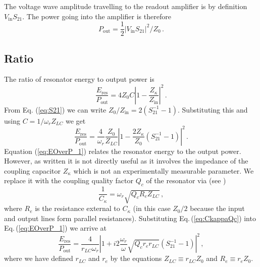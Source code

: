 The voltage wave amplitude travelling to the readout amplifier is by definition $V_{\text{in}}S_{21}$. The power going into the amplifier is therefore \begin{equation}
P_{\text{out}} = \frac{1}{2} \left| V_{\text{in}} S_{21} \right|^2/Z_0 \, . \end{equation}

\subsection{Ratio}

The ratio of resonator energy to output power is \begin{equation}
\frac{E_{\text{res}}}{P_{\text{out}}} = 4 Z_0 C \left| 1 - \frac{Z_{\kappa}}{Z_{\text{in}}} \right|^2 \, . \end{equation}
From Eq. (\ref{eq:S21}) we can write $Z_0/Z_{\text{in}} = 2(S_{21}^{-1} - 1)$. Substituting this and using $C=1/\omega_r Z_{LC}$ we get \begin{equation}
\frac{E_{\text{res}}}{P_{\text{out}}} = \frac{4}{\omega_r}\frac{Z_0}{Z_{LC}} \left| 1 - \frac{2Z_{\kappa}}{Z_0}\left( S_{21}^{-1}-1 \right) \right| ^2 \, . \label{eq:EOverP_1} \end{equation}
Equation (\ref{eq:EOverP_1}) relates the resonator energy to the output power. However, as written it is not directly useful as it involves the impedance of the coupling capacitor $Z_{\kappa}$ which is not an experimentally measurable parameter. We replace it with the coupling quality factor $Q_c$ of the resonator via (see \citeinternaltype {}) \begin{equation}
\frac{1}{C_{\kappa}} = \omega_r \sqrt{Q_c R_e Z_{LC}} \label{eq:CkappaQc} \, , \end{equation}
where $R_e$ is the resistance external to $C_{\kappa}$ (in this case $Z_0/2$ because the input and output lines form parallel resistances). Substituting Eq.\,(\ref{eq:CkappaQc}) into Eq.\,(\ref{eq:EOverP_1}) we arrive at \begin{equation}
\frac{E_{\text{res}}}{P_{\text{out}}} = \frac{4}{r_{LC} \omega_r} \left| 1 + i 2 \frac{\omega_r}{\omega} \sqrt{Q_c r_e r_{LC}} \left( S_{21}^{-1} - 1 \right) \right|^2 \, , \label{eq:EOverP} \end{equation}
where we have defined $r_{LC}$ and $r_e$ by the equations $Z_{LC} \equiv r_{LC}Z_0$ and $R_e \equiv r_e Z_0$.

